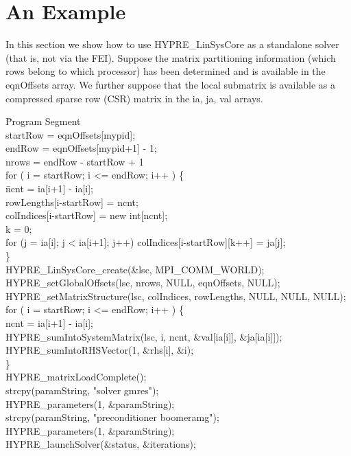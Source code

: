 \section{An Example}

In this section we show how to use {\sf HYPRE\_LinSysCore} as a standalone
solver (that is, not via the FEI).  Suppose the matrix partitioning information 
(which rows belong to which processor) has been determined and is available
in the {\sf eqnOffsets} array.  We further suppose that the local submatrix is
available as a compressed sparse row (CSR) matrix in the {\sf ia, ja, val} arrays. 

\begin{tabbing}
\hspace{0.5in} \= {\sf Program Segment} \\[1mm]
\> {\sf startRow = eqnOffsets[mypid];} \\
\> {\sf endRow = eqnOffsets[mypid+1] - 1;} \\
\> {\sf nrows = endRow - startRow + 1} \\
\> {\sf for ( i = startRow; i <= endRow; i++ ) \{ } \\
\> \hspace{0.3in} \= {\sf ncnt = ia[i+1] - ia[i];} \\
\> \> {\sf rowLengths[i-startRow] = ncnt;} \\
\> \> {\sf colIndices[i-startRow] = new int[ncnt];} \\
\> \> {\sf k = 0;} \\
\> \> {\sf for (j = ia[i]; j < ia[i+1]; j++) colIndices[i-startRow][k++] = ja[j];}\\
\> \} \\
\> {\sf HYPRE\_LinSysCore\_create(\&lsc, MPI\_COMM\_WORLD);} \\
\> {\sf HYPRE\_setGlobalOffsets(lsc, nrows, NULL, eqnOffsets, NULL);} \\
\> {\sf HYPRE\_setMatrixStructure(lsc, colIndices, rowLengths, NULL, NULL, NULL);} \\
\> {\sf for ( i = startRow; i <= endRow; i++ ) \{ } \\
\> \> {\sf ncnt = ia[i+1] - ia[i];} \\
\> \> {\sf HYPRE\_sumIntoSystemMatrix(lsc, i, ncnt, \&val[ia[i]], \&ja[ia[i]]);}\\
\> \> {\sf HYPRE\_sumIntoRHSVector(1, \&rhs[i], \&i);} \\
\> \} \\
\> {\sf HYPRE\_matrixLoadComplete();}\\
\> {\sf strcpy(paramString, "solver gmres");} \\
\> {\sf HYPRE\_parameters(1, \&paramString);} \\
\> {\sf strcpy(paramString, "preconditioner boomeramg");} \\
\> {\sf HYPRE\_parameters(1, \&paramString);} \\
\> {\sf HYPRE\_launchSolver(\&status, \&iterations);}
\end{tabbing}

